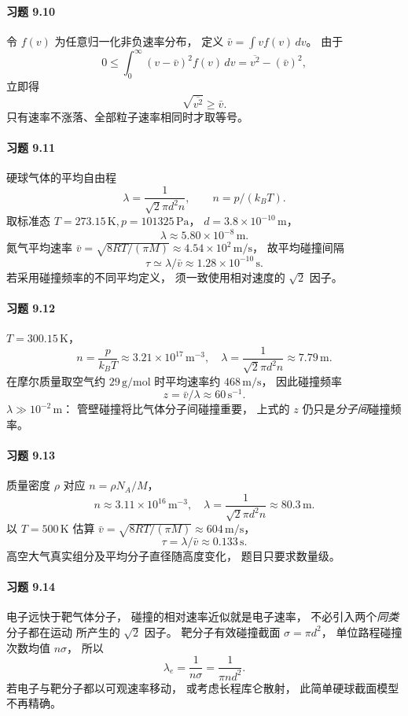 \paragraph{习题 9.10}
令 \(f(v)\) 为任意归一化非负速率分布，
定义 \(\bar v=\int vf(v)\,dv\)。
由于
\[
 0\le\int_0^\infty(v-\bar v)^2f(v)\,dv
 =\overline{v^2}-(\bar v)^2,
\]
立即得
\[
 \boxed{\sqrt{\overline{v^2}}\ge\bar v}.
\]
只有速率不涨落、全部粒子速率相同时才取等号。

\paragraph{习题 9.11}
硬球气体的平均自由程
\[
 \lambda=\frac1{\sqrt2\pi d^2n},\qquad
 n=p/(k_BT).
\]
取标准态 \(T=273.15\,\mathrm K,p=101325\,\mathrm{Pa}\)，
\(d=3.8\times10^{-10}\,\mathrm m\)，
\[
 \boxed{\lambda\approx5.80\times10^{-8}\,\mathrm m}.
\]
氮气平均速率
\(\bar v=\sqrt{8RT/(\pi M)}
 \approx4.54\times10^2\,\mathrm{m/s}\)，
故平均碰撞间隔
\[
 \boxed{\tau\simeq\lambda/\bar v
 \approx1.28\times10^{-10}\,\mathrm s}.
\]
若采用碰撞频率的不同平均定义，
须一致使用相对速度的 \(\sqrt2\) 因子。

\paragraph{习题 9.12}
\(T=300.15\,\mathrm K\)，
\[
 \boxed{n=\frac p{k_BT}
 \approx3.21\times10^{17}\,\mathrm{m^{-3}}},
\quad
 \boxed{\lambda=\frac1{\sqrt2\pi d^2n}
 \approx7.79\,\mathrm m}.
\]
在摩尔质量取空气约 \(29\,\mathrm{g/mol}\)
时平均速率约 \(468\,\mathrm{m/s}\)，
因此碰撞频率
\[
 \boxed{z=\bar v/\lambda\approx60\,\mathrm{s^{-1}}}.
\]
\(\lambda\gg10^{-2}\,\mathrm m\)：
管壁碰撞将比气体分子间碰撞重要，
上式的 \(z\) 仍只是\emph{分子间}碰撞频率。

\paragraph{习题 9.13}
质量密度 \(\rho\) 对应
\(n=\rho N_A/M\)，
\[
 \boxed{n\approx3.11\times10^{16}\,\mathrm{m^{-3}}},
\quad
 \boxed{\lambda=\frac1{\sqrt2\pi d^2n}
 \approx80.3\,\mathrm m}.
\]
以 \(T=500\,\mathrm K\) 估算
\(\bar v=\sqrt{8RT/(\pi M)}
 \approx604\,\mathrm{m/s}\)，
\[
 \boxed{\tau=\lambda/\bar v\approx0.133\,\mathrm s}.
\]
高空大气真实组分及平均分子直径随高度变化，
题目只要求数量级。

\paragraph{习题 9.14}
电子远快于靶气体分子，
碰撞的相对速率近似就是电子速率，
不必引入两个\emph{同类}分子都在运动
所产生的 \(\sqrt2\) 因子。
靶分子有效碰撞截面
\(\sigma=\pi d^2\)，
单位路程碰撞次数均值 \(n\sigma\)，
所以
\[
 \boxed{\lambda_e=\frac1{n\sigma}
 =\frac1{\pi nd^2}}.
\]
若电子与靶分子都以可观速率移动，
或考虑长程库仑散射，
此简单硬球截面模型不再精确。


